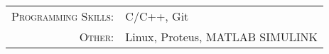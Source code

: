 
\renewcommand{\arraystretch}{1.1}

\begin{tabular}{>{}r>{}p{13cm}}
	\textsc{Programming Skills:}            & C/C++, Git                                                               \\
	\textsc{Other:}                         & Linux, Proteus, MATLAB SIMULINK
\end{tabular}
